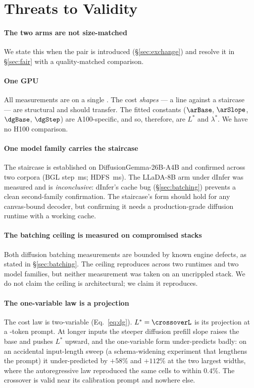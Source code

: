 \section{Threats to Validity}
\label{sec:threats}

\paragraph{The two arms are not size-matched}
We state this when the pair is introduced (\S\ref{sec:exchange}) and resolve it
in \S\ref{sec:fair} with a quality-matched comparison.

\paragraph{One GPU}
All measurements are on a single \gpuModel. The cost \emph{shapes} --- a line
against a staircase --- are structural and should transfer. The fitted
constants ($\arBase$, $\arSlope$, $\dgBase$, $\dgStep$) are A100-specific, and
so, therefore, are $L^{*}$ and $\lambda^{*}$. We have no H100 comparison.

\paragraph{One model family carries the staircase}
The staircase is established on DiffusionGemma-26B-A4B and confirmed across
two corpora (BGL step \bglStep\,ms; HDFS \hdfsStep\,ms). The LLaDA-8B arm
under dInfer was measured and is \emph{inconclusive}: dInfer's cache bug
(\S\ref{sec:batching}) prevents a clean second-family confirmation. The
staircase's form should hold for any canvas-bound decoder, but confirming
it needs a production-grade diffusion runtime with a working cache.

\paragraph{The batching ceiling is measured on compromised stacks}
Both diffusion batching measurements are bounded by known engine defects,
as stated in \S\ref{sec:batching}. The ceiling reproduces across two runtimes
and two model families, but neither measurement was taken on an uncrippled
stack. We do not claim the ceiling is architectural; we claim it reproduces.

\paragraph{The one-variable law is a projection}
The cost law is two-variable (Eq.~\ref{eq:dg}). $L^{*} = \crossoverL$ is its
projection at a -token prompt. At longer inputs the steeper
diffusion prefill slope raises the base and pushes $L^{*}$ upward, and the
one-variable form under-predicts badly: on an accidental input-length sweep
(a schema-widening experiment that lengthens the prompt) it under-predicted by
$+58\%$ and $+112\%$ at the two largest widths, where the autoregressive law
reproduced the same cells to within $0.4\%$. The crossover is valid near its
calibration prompt and nowhere else.

